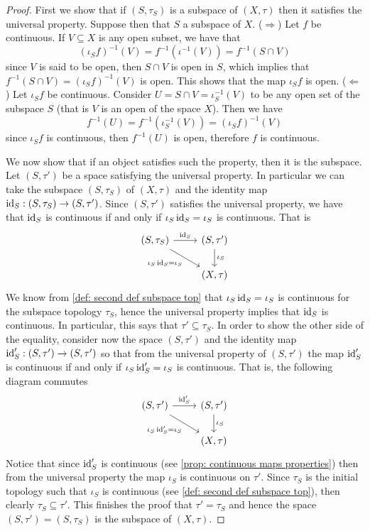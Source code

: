 \begin{proof}
First we show that if \((S, \tau_S)\) is a subspace of \((X, \tau)\) then
it satisfies the universal property. Suppose then that \(S\) a subspace of
\(X\). (\(\Rightarrow\)) Let \(f\) be continuous. If \(V \subseteq X\) is any open subset, we have
that
\[
  (\iota_S  f)^{-1}(V) = f^{-1}(\iota^{-1}(V)) = f^{-1}(S \cap V)
\]
since \(V\) is said to be open, then \(S \cap V\) is open in \(S\), which
implies that \(f^{-1}(S \cap V) = (\iota_S  f)^{-1}(V)\) is open. This
shows that the map \(\iota_S  f\) is open. (\(\Leftarrow\)) Let \(\iota_S
  f\) be continuous. Consider \(U = S \cap V = \iota_S^{-1}(V)\) to be any
open set of the subspace \(S\) (that is \(V\) is an open of the space \(X\)).
Then we have
\[
  f^{-1}(U) = f^{-1}(\iota_S^{-1}(V)) = (\iota_S  f)^{-1}(V)
\]
since \(\iota_S  f\) is continuous, then \(f^{-1}(U)\) is open, therefore
\(f\) is continuous.

We now show that if an object satisfies such the property, then it is the
subspace. Let \((S, \tau')\) be a space satisfying the universal
property. In particular we can take the subspace \((S, \tau_S)\) of
\((X, \tau)\) and the identity map \(\operatorname{id}_S: (S, \tau_S) \to (S,
\tau')\). Since \((S, \tau')\) satisfies the universal property,
we have that \(\operatorname{id}_S\) is continuous if and only if \(\iota_S  \operatorname{id}_S =
\iota_S\) is continuous. That is
\[
  \begin{tikzcd}
    (S, \tau_S)
    \ar[r, "\Id_S"]
    \ar[rd, swap, "\iota_S  \Id_S = \iota_S"]
      &(S, \tau') \ar[d, "\iota_S"] \\
      &(X, \tau)
  \end{tikzcd}
\]
We know from \cref{def: second def subspace top} that \(\iota_S  \operatorname{id}_S =
\iota_S\) is continuous for the subspace topology \(\tau_S\), hence the
universal property implies that \(\operatorname{id}_S\) is continuous. In particular, this
says that \(\tau' \subseteq \tau_S\). In order to show the other
side of the equality, consider now the space \((S, \tau')\) and the
identity map \(\operatorname{id}_S': (S, \tau') \to (S, \tau')\) so that from the
universal property of \((S, \tau')\) the map \(\operatorname{id}_S'\) is continuous if
and only if \(\iota_S  \operatorname{id}_S' = \iota_S\) is continuous. That is, the
following diagram commutes
\[
  \begin{tikzcd}
    (S, \tau') \ar[r, "\Id_S'"]
    \ar[rd, swap, "\iota_S  \Id_S' = \iota_S"]
      &(S, \tau') \ar[d, "\iota_S"] \\
      &(X, \tau)
  \end{tikzcd}
\]
Notice that since \(\operatorname{id}_S'\) is continuous (see \cref{prop: continuous maps
properties}) then from the universal property the map \(\iota_S\) is
continuous on \(\tau'\). Since \(\tau_S\) is the initial topology
such that \(\iota_S\) is continuous (see \cref{def: second def subspace top}),
then clearly \(\tau_S \subseteq \tau'\). This finishes the proof
that \(\tau' = \tau_S\) and hence the space \((S, \tau') =
(S, \tau_S)\) is the subspace of \((X, \tau)\).
\end{proof}

